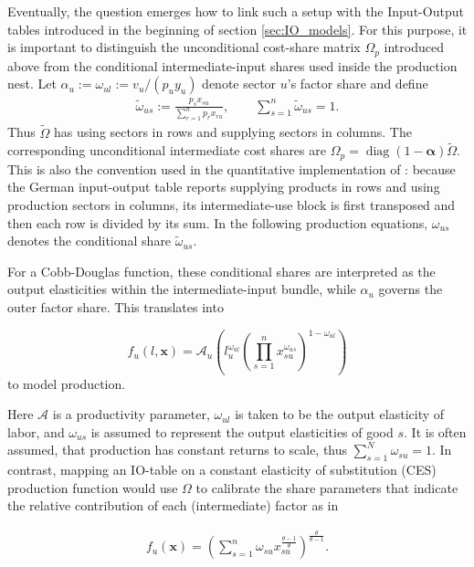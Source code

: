 \documentclass{article}
\begin{document}
Eventually, the question emerges how to link such a setup with the Input-Output tables introduced in the beginning of section \ref{sec:IO_models}. For this purpose, it is important to distinguish the unconditional cost-share matrix $\Omega_p$ introduced above from the conditional intermediate-input shares used inside the production nest. Let $\alpha_u:=\omega_{ul}:=v_u/(p_u y_u)$ denote sector $u$'s factor share and define
\begin{align}
  \widetilde\omega_{us}:=\frac{p_sx_{su}}{\sum_{r=1}^n p_rx_{ru}}, \qquad \sum_{s=1}^n\widetilde\omega_{us}=1.
\end{align}
Thus $\widetilde\Omega$ has using sectors in rows and supplying sectors in columns. The corresponding unconditional intermediate cost shares are $\Omega_p=\operatorname{diag}(1-\boldsymbol\alpha)\widetilde\Omega$. This is also the convention used in the quantitative implementation of \citet{BF2019}: because the German input-output table reports supplying products in rows and using production sectors in columns, its intermediate-use block is first transposed and then each row is divided by its sum. In the following production equations, $\omega_{us}$ denotes the conditional share $\widetilde\omega_{us}$.

For a Cobb-Douglas function, these conditional shares are interpreted as the output elasticities within the intermediate-input bundle, while $\alpha_u$ governs the outer factor share. This translates into

\begin{equation}
  \label{eq:cobbdouglasprodfun}
  f_u(l,\mathbf x) = \mathcal A_u \left(l_u^{\omega_{ul}} \left(\prod_{s=1}^n x_{su}^{\omega_{us}}\right)^{1-\omega_{ul}}\right)
\end{equation}
to model production.

Here $\mathbf{\mathcal A}$ is a productivity parameter, $\omega_{ul}$ is taken to be the output elasticity of labor, and $\omega_{us}$ is assumed to represent the output elasticities of good $s$. It is often assumed, that production has constant returns to scale, thus $\sum_{s=1}^N \omega_{su} = 1$. In contrast, mapping an IO-table on a constant elasticity of substitution (CES) production function would use $\Omega$ to calibrate the share parameters that indicate the relative contribution of each (intermediate) factor as in 

\begin{align}
  f_u(\mathbf x) = \left( \sum_{s = 1}^n \omega_{su} x_{su}^{\frac{\theta - 1}{\theta}}\right)^{\frac{\theta}{\theta - 1}}.
\end{align}
\end{document}
